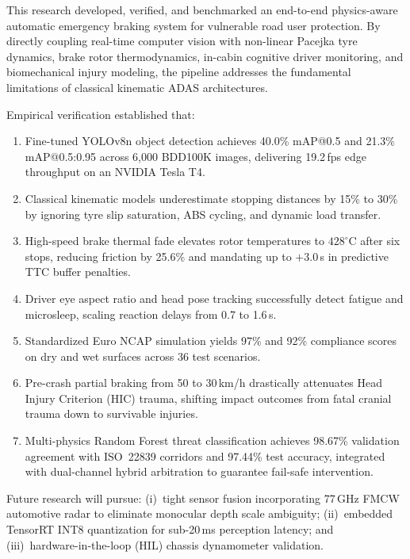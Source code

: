 \documentclass[3p,twocolumn]{elsarticle}
\begin{document}
This research developed, verified, and benchmarked an end-to-end physics-aware automatic emergency braking system for vulnerable road user protection. By directly coupling real-time computer vision with non-linear Pacejka tyre dynamics, brake rotor thermodynamics, in-cabin cognitive driver monitoring, and biomechanical injury modeling, the pipeline addresses the fundamental limitations of classical kinematic ADAS architectures.

Empirical verification established that:
\begin{enumerate}
  \item Fine-tuned YOLOv8n object detection achieves 40.0\% mAP@0.5 and 21.3\% mAP@0.5:0.95 across 6,000 BDD100K images, delivering 19.2\,fps edge throughput on an NVIDIA Tesla T4.
  \item Classical kinematic models underestimate stopping distances by 15\% to 30\% by ignoring tyre slip saturation, ABS cycling, and dynamic load transfer.
  \item High-speed brake thermal fade elevates rotor temperatures to $428^\circ\text{C}$ after six stops, reducing friction by 25.6\% and mandating up to $+3.0$\,s in predictive TTC buffer penalties.
  \item Driver eye aspect ratio and head pose tracking successfully detect fatigue and microsleep, scaling reaction delays from 0.7 to 1.6\,s.
  \item Standardized Euro NCAP simulation yields 97\% and 92\% compliance scores on dry and wet surfaces across 36 test scenarios.
  \item Pre-crash partial braking from 50 to 30\,km/h drastically attenuates Head Injury Criterion (HIC) trauma, shifting impact outcomes from fatal cranial trauma down to survivable injuries.
  \item Multi-physics Random Forest threat classification achieves 98.67\% validation agreement with ISO~22839 corridors and 97.44\% test accuracy, integrated with dual-channel hybrid arbitration to guarantee fail-safe intervention.
\end{enumerate}

Future research will pursue: (i)~tight sensor fusion incorporating 77\,GHz FMCW automotive radar to eliminate monocular depth scale ambiguity; (ii)~embedded TensorRT INT8 quantization for sub-20\,ms perception latency; and (iii)~hardware-in-the-loop (HIL) chassis dynamometer validation.

\end{document}
